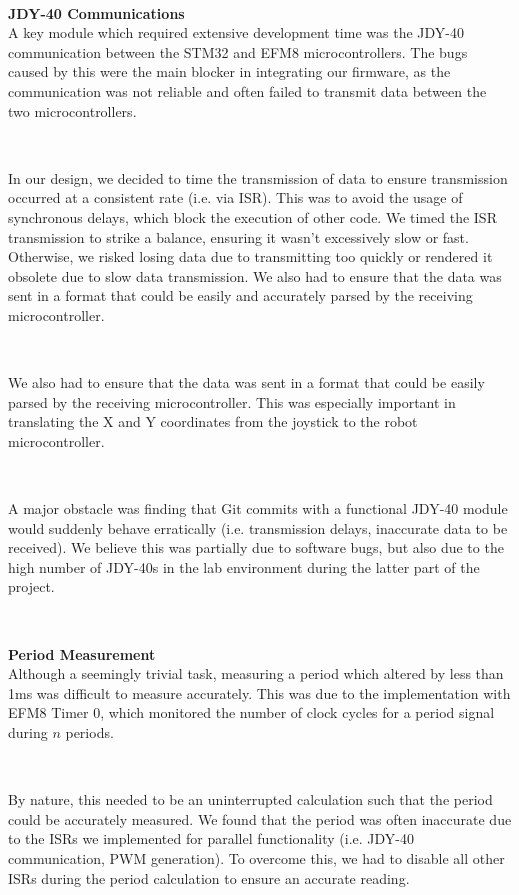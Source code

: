 \documentclass{article}
\begin{document}
\

\textbf{JDY-40 Communications} \\
A key module which required extensive development time was the JDY-40 communication between the STM32 and EFM8 microcontrollers.
The bugs caused by this were the main blocker in integrating our firmware, as the communication was not reliable and often failed to transmit
data between the two microcontrollers.

\

In our design, we decided to time the transmission of data to ensure transmission occurred at a consistent rate (i.e. via ISR).
This was to avoid the usage of synchronous delays, which block the execution of other code. We timed the ISR transmission to strike a balance,
ensuring it wasn't excessively slow or fast. Otherwise, we risked losing data due to transmitting too quickly or rendered it obsolete
due to slow data transmission. We also had to ensure that the data was sent in a format that could be easily and accurately parsed by the
receiving microcontroller.

\

We also had to ensure that the data was sent in a format that could be easily parsed by the receiving microcontroller. This was especially important in translating the
X and Y coordinates from the joystick to the robot microcontroller.

\

A major obstacle was finding that Git commits with a functional JDY-40 module would suddenly behave erratically
(i.e. transmission delays, inaccurate data to be received). We believe this was partially due to software bugs, but also due to the high number of JDY-40s in the lab environment during the latter part of the project.

\

\textbf{Period Measurement} \\
Although a seemingly trivial task, measuring a period which altered by less than
1ms was difficult to measure accurately. This was due to the implementation with EFM8 Timer 0,
which monitored the number of clock cycles for a period signal during $n$ periods.

\

By nature, this needed to be an uninterrupted calculation such that the period could be accurately measured. We found that the period was often inaccurate due to the ISRs we implemented for
parallel functionality (i.e. JDY-40 communication, PWM generation). To overcome this, we had to disable all other ISRs during the period calculation to ensure an accurate reading.
\end{document}
